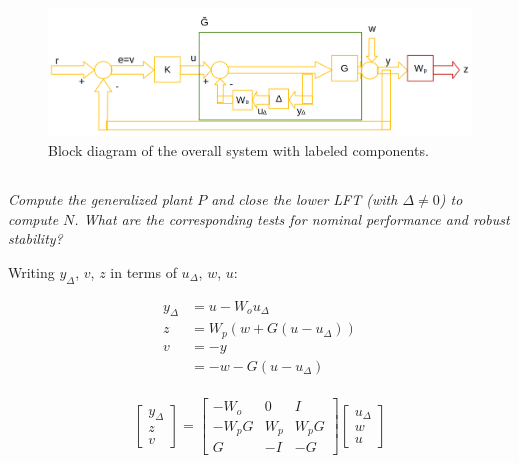 \documentclass{article}
\begin{document}
\begin{figure}[H]
    \centering
    \includegraphics[width=\textwidth]{1blockDiagram.png}
    \caption{Block diagram of the overall system with labeled components.}
    \label{fig:1blockDiagram}
\end{figure}

\subsection{} 
\textit{Compute the generalized plant $P$ and close the lower LFT (with $\Delta \neq 0$) to compute $N$. What are the corresponding tests for nominal performance and robust stability?}

Writing $y_{\Delta}$, $v$, $z$ in terms of $u_{\Delta}$, $w$, $u$:

\begin{align*}
    y_{\Delta} &= u - W_o u_{\Delta} \\
    z &= W_p(w + G(u - u_{\Delta})) \\
    v &= -y \\
      &= -w -G(u-u_{\Delta}) \\
\end{align*}

\[
\begin{bmatrix}
    y_{\Delta} \\
    z \\
    v
\end{bmatrix}
=
\begin{bmatrix}
    -W_o & 0 & I \\
    -W_p G & W_p & W_p G \\
    G & -I & -G
\end{bmatrix}
\begin{bmatrix}
    u_{\Delta} \\
    w \\
    u
\end{bmatrix}
\]
\end{document}
